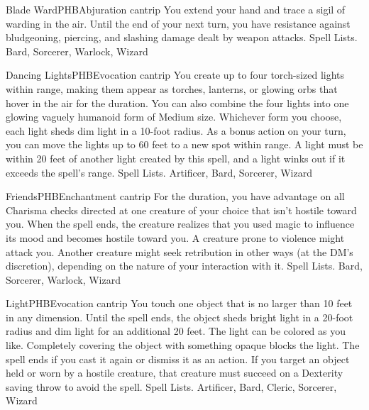 \begin{spell}{Blade Ward}{PHB}{Abjuration cantrip}
{
}
You extend your hand and trace a sigil of warding in the air. Until the end of your next turn, you have resistance against bludgeoning, piercing, and slashing damage dealt by weapon attacks.
Spell Lists. Bard, Sorcerer, Warlock, Wizard
\end{spell}

\begin{spell}{Dancing Lights}{PHB}{Evocation cantrip}
{
}
You create up to four torch-sized lights within range, making them appear as torches, lanterns, or glowing orbs that hover in the air for the duration. You can also combine the four lights into one glowing vaguely humanoid form of Medium size. Whichever form you choose, each light sheds dim light in a 10-foot radius.
As a bonus action on your turn, you can move the lights up to 60 feet to a new spot within range. A light must be within 20 feet of another light created by this spell, and a light winks out if it exceeds the spell’s range.
Spell Lists. Artificer, Bard, Sorcerer, Wizard
\end{spell}

\begin{spell}{Friends}{PHB}{Enchantment cantrip}
{
}
For the duration, you have advantage on all Charisma checks directed at one creature of your choice that isn't hostile toward you. When the spell ends, the creature realizes that you used magic to influence its mood and becomes hostile toward you. A creature prone to violence might attack you. Another creature might seek retribution in other ways (at the DM's discretion), depending on the nature of your interaction with it.
Spell Lists. Bard, Sorcerer, Warlock, Wizard
\end{spell}

\begin{spell}{Light}{PHB}{Evocation cantrip}
{
}
You touch one object that is no larger than 10 feet in any dimension. Until the spell ends, the object sheds bright light in a 20-foot radius and dim light for an additional 20 feet. The light can be colored as you like. Completely covering the object with something opaque blocks the light. The spell ends if you cast it again or dismiss it as an action.
If you target an object held or worn by a hostile creature, that creature must succeed on a Dexterity saving throw to avoid the spell.
Spell Lists. Artificer, Bard, Cleric, Sorcerer, Wizard
\end{spell}

